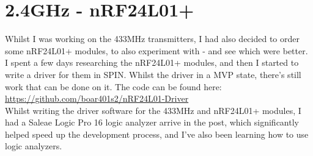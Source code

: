 			\section{2.4GHz - nRF24L01+}
            	\label{sec:nRF24L01+}
				Whilst I was working on the 433MHz transmitters, I had also decided to order some nRF24L01+ modules, to also experiment with - and see which were better.\\
				
				I spent a few days researching the nRF24L01+ modules, and then I started to write a driver for them in SPIN. Whilst the driver in a MVP state, there's still work that can be done on it. The code can be found here: \\
				
				\url{https://github.com/boar401s2/nRF24L01-Driver}\\
				
				Whilst writing the driver software for the 433MHz and nRF24L01+ modules, I had a Saleae Logic Pro 16 logic analyzer arrive in the post, which significantly helped speed up the development process, and I've also been learning how to use logic analyzers.\\
				
